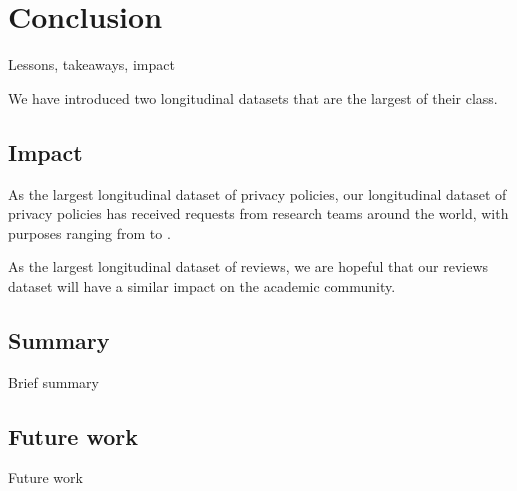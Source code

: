 \chapter{Conclusion} \label{ch:conclusion}
Lessons, takeaways, impact

We have introduced two longitudinal datasets that are the largest of their class. 

\section{Impact}
As the largest longitudinal dataset of privacy policies, our longitudinal dataset of privacy policies has received  requests from research teams around the world, with purposes ranging from  to .

As the largest longitudinal dataset of reviews, we are hopeful that our reviews dataset will have a similar impact on the academic community.

\section{Summary}
Brief summary

\section{Future work}
Future work
